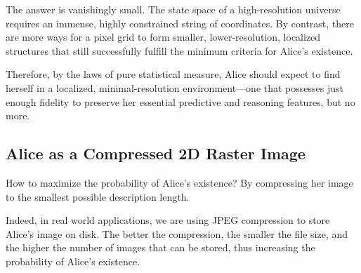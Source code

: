 The answer is vanishingly small. The state space of a high-resolution universe requires an immense, highly constrained string of coordinates.
By contrast, there are more ways for a pixel grid to form smaller, lower-resolution, localized structures that still successfully fulfill the minimum criteria for Alice's existence. 

Therefore, by the laws of pure statistical measure,
Alice should expect to find herself in a localized, minimal-resolution environment—one that possesses just enough fidelity to preserve her essential predictive and reasoning features, but no more. 

\subsection*{Alice as a Compressed 2D Raster Image}

How to maximize the probability of Alice's existence? By compressing her image to the smallest possible description length.

Indeed, in real world applications, we are using JPEG compression to store Alice's image on disk. 
The better the compression, the smaller the file size, and the higher the number of images that can be stored, thus increasing the probability of Alice's existence. 